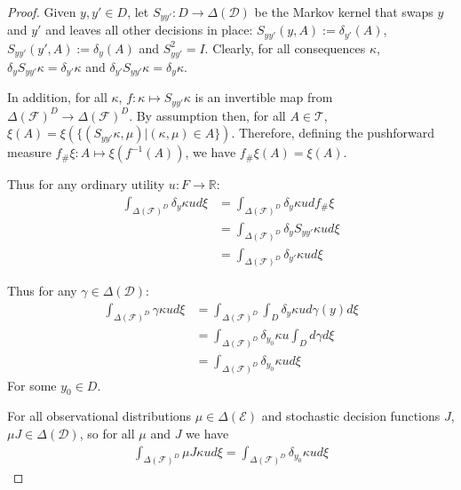 \begin{proof}
Given $y,y'\in D$, let $S_{yy'}:D\to \Delta(\mathcal{D})$ be the Markov kernel that swaps $y$ and $y'$ and leaves all other decisions in place: $S_{yy'}(y,A) := \delta_{y'}(A)$, $S_{yy'}(y',A):=\delta_{y}(A)$ and $S_{yy'}^2=I$. Clearly, for all consequences $\kappa$, $\delta_y S_{yy'} \kappa = \delta_{y'}\kappa$ and $\delta_{y'} S_{yy'} \kappa = \delta_{y}\kappa$.

In addition, for all $\kappa$, $f:\kappa\mapsto S_{yy'}\kappa$ is an invertible map from $\Delta(\mathcal{F})^D\to \Delta(\mathcal{F})^D$. By assumption then, for all $A\in \mathcal{T}$, $\xi(A) = \xi(\{(S_{yy'}\kappa,\mu)|(\kappa,\mu)\in A\})$. Therefore, defining the pushforward measure $f_{\#}\xi:A\mapsto \xi(f^{-1}(A))$, we have $f_{\#}\xi(A) = \xi(A)$.

Thus for any ordinary utility $u:F\to \mathbb{R}$:
\begin{align}
    \int_{\Delta(\mathcal{F})^D} \delta_y \kappa u d\xi &= \int_{\Delta(\mathcal{F})^D} \delta_{y} \kappa u df_{\#}\xi\\
                                                        &= \int_{\Delta(\mathcal{F})^D} \delta_y S_{yy'}\kappa u d\xi\\
                                                        &= \int_{\Delta(\mathcal{F})^D} \delta_{y'}\kappa u d\xi
\end{align}

Thus for any $\gamma\in\Delta(\mathcal{D})$:
\begin{align}
   \int_{\Delta(\mathcal{F})^D} \gamma \kappa u d\xi &= \int_{\Delta(\mathcal{F})^D} \int_D \delta_y \kappa u d\gamma(y) d\xi\\
                                                     &= \int_{\Delta(\mathcal{F})^D} \delta_{y_0} \kappa u \int_D  d\gamma d\xi\\
                                                     &= \int_{\Delta(\mathcal{F})^D} \delta_{y_0} \kappa u d\xi
\end{align}
For some $y_0\in D$.

For all observational distributions $\mu\in \Delta(\mathcal{E})$ and stochastic decision functions $J$, $\mu J \in \Delta(\mathcal{D})$, so for all $\mu$ and $J$ we have
\begin{align}
    \int_{\Delta(\mathcal{F})^D} \mu J \kappa u d\xi = \int_{\Delta(\mathcal{F})^D} \delta_{y_0} \kappa u d\xi
\end{align}

\end{proof}

